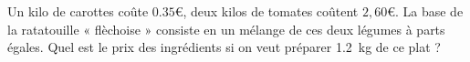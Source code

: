 
\begin{exercice}\label{exo2smath-0250}

    Un kilo de carottes coûte $0.35$€, deux kilos de tomates coûtent $2,60$€. La base de la ratatouille « flèchoise » consiste en un mélange de ces deux légumes à parts égales. Quel est le prix des ingrédients si on veut préparer \SI{1.2}{\kilo\gram} de ce plat ?

\end{exercice}
